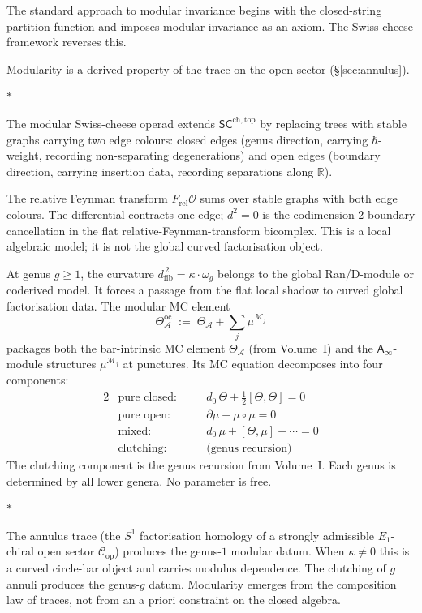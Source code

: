 \documentclass[11pt]{article}
\newcommand{\cA}{\mathcal{A}}
\newcommand{\cC}{\mathcal{C}}
\newcommand{\cM}{\mathcal{M}}
\newcommand{\cO}{\mathcal{O}}
\newcommand{\R}{\mathbb{R}}
\newcommand{\Ainf}{\mathsf{A}_{\infty}}
\newcommand{\SCchtop}{\mathsf{SC}^{\mathrm{ch,top}}}
\newcommand{\dfib}{d_{\mathrm{fib}}}
\newcommand{\sep}{\bigskip\begin{center}$*$\end{center}\medskip}
\begin{document}
The standard approach to modular invariance begins with the
closed-string partition function and imposes modular invariance
as an axiom.  The Swiss-cheese framework reverses this.

Modularity is a derived property of the trace on the open sector
(\S\ref{sec:annulus}).

\sep

The modular Swiss-cheese operad extends $\SCchtop$ by replacing
trees with stable graphs carrying two edge colours: closed
edges (genus direction, carrying $\hbar$-weight, recording
non-separating degenerations) and open edges (boundary direction,
carrying insertion data, recording separations along $\R$).

The relative Feynman transform $F_{\mathrm{rel}}\cO$ sums over
stable graphs with both edge colours.  The differential contracts
one edge; $d^2 = 0$ is the codimension-$2$ boundary cancellation
in the flat relative-Feynman-transform bicomplex.  This is a
local algebraic model; it is not the global curved factorisation
object.

At genus $g \geq 1$, the curvature
$\dfib^{\,2} = \kappa \cdot \omega_g$ belongs to the global
Ran/D-module or coderived model.  It forces a passage from the
flat local shadow to curved global factorisation data.  The
modular MC element
\begin{equation}\label{eq:oc-mc-wn}
\Theta^{\mathrm{oc}}_\cA
\;:=\;
\Theta_\cA + \sum_{j} \mu^{\cM_j}
\end{equation}
packages both the bar-intrinsic MC element $\Theta_\cA$ (from
Volume~I) and the $\Ainf$-module structures $\mu^{\cM_j}$ at
punctures.  Its MC equation decomposes into four components:
\begin{alignat*}{2}
&\text{pure closed:} &&\quad d_0\,\Theta
  + \tfrac{1}{2}[\Theta, \Theta] = 0 \\[3pt]
&\text{pure open:} &&\quad \partial\mu
  + \mu \circ \mu = 0 \\[3pt]
&\text{mixed:} &&\quad d_0\,\mu
  + [\Theta, \mu] + \cdots = 0 \\[3pt]
&\text{clutching:} &&\quad \text{(genus recursion)}
\end{alignat*}
The clutching component is the genus recursion from Volume~I.
Each genus is determined by all lower genera.  No parameter
is free.

\sep

The annulus trace (the $S^1$ factorisation homology of a strongly
admissible $E_1$-chiral open sector $\cC_{\mathrm{op}}$) produces
the genus-$1$ modular datum.  When $\kappa\ne0$ this is a curved
circle-bar object and carries modulus dependence.
The clutching of $g$ annuli produces the genus-$g$ datum.
Modularity emerges from the composition law of traces, not
from an a priori constraint on the closed algebra.
\end{document}
